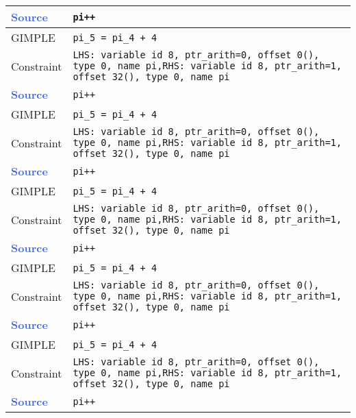 \begin{center}
\begin{longtable}{| m{10ex} | m{75ex} |}
            \hline
            \hline
            \textcolor{RoyalBlue}{\textbf{Source}} & \texttt{pi++} \\ \hline
            GIMPLE & \texttt{pi\_5 = pi\_4 + 4} \\ \hline
            Constraint & \texttt{LHS: variable id 8, ptr\_arith=0, offset 0(), type 0, name pi,\newline RHS: variable id 8, ptr\_arith=1, offset 32(), type 0, name pi} \\
            \hline
            \hline
            \textcolor{RoyalBlue}{\textbf{Source}} & \texttt{pi++} \\ \hline
            GIMPLE & \texttt{pi\_5 = pi\_4 + 4} \\ \hline
            Constraint & \texttt{LHS: variable id 8, ptr\_arith=0, offset 0(), type 0, name pi,\newline RHS: variable id 8, ptr\_arith=1, offset 32(), type 0, name pi} \\
            \hline
            \hline
            \textcolor{RoyalBlue}{\textbf{Source}} & \texttt{pi++} \\ \hline
            GIMPLE & \texttt{pi\_5 = pi\_4 + 4} \\ \hline
            Constraint & \texttt{LHS: variable id 8, ptr\_arith=0, offset 0(), type 0, name pi,\newline RHS: variable id 8, ptr\_arith=1, offset 32(), type 0, name pi} \\
            \hline
            \hline
            \textcolor{RoyalBlue}{\textbf{Source}} & \texttt{pi++} \\ \hline
            GIMPLE & \texttt{pi\_5 = pi\_4 + 4} \\ \hline
            Constraint & \texttt{LHS: variable id 8, ptr\_arith=0, offset 0(), type 0, name pi,\newline RHS: variable id 8, ptr\_arith=1, offset 32(), type 0, name pi} \\
            \hline
            \hline
            \textcolor{RoyalBlue}{\textbf{Source}} & \texttt{pi++} \\ \hline
            GIMPLE & \texttt{pi\_5 = pi\_4 + 4} \\ \hline
            Constraint & \texttt{LHS: variable id 8, ptr\_arith=0, offset 0(), type 0, name pi,\newline RHS: variable id 8, ptr\_arith=1, offset 32(), type 0, name pi} \\
            \hline
            \hline
            \textcolor{RoyalBlue}{\textbf{Source}} & \texttt{pi++} \\ \hline

\end{longtable}
\end{center}
